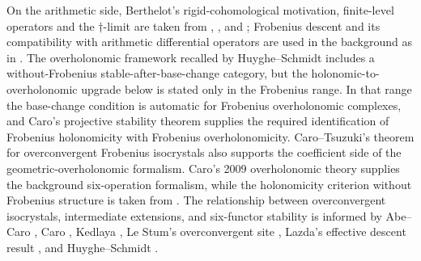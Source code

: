 \documentclass[11pt]{amsart}
\theoremstyle{plain}
\theoremstyle{definition}
\theoremstyle{remark}
\begin{document}
On the arithmetic side, Berthelot's rigid-cohomological motivation,
finite-level operators and the \(\dagger\)-limit are taken from
\cite[\S3]{BerthelotRigidDwork}, \cite[\S\S2.2--3]{BerthelotDModules}, and
\cite[\S2]{BerthelotIntro}; Frobenius descent and its compatibility with
arithmetic differential operators are used in the background as in
\cite[\S3]{BerthelotDescente}.  The overholonomic framework recalled by Huyghe--Schmidt
\cite[\S2.1, first paragraphs, Definition 2.1.3 and Theorem 2.1.4]{HuygheSchmidtIntermediate} includes a without-Frobenius
stable-after-base-change category, but the holonomic-to-overholonomic upgrade below is
stated only in the Frobenius range. In that range the base-change condition is automatic for
Frobenius overholonomic complexes, and Caro's projective stability theorem supplies the required identification of Frobenius holonomicity with Frobenius overholonomicity. Caro--Tsuzuki's theorem for overconvergent Frobenius isocrystals also supports the coefficient side of the geometric-overholonomic formalism. Caro's 2009 overholonomic theory \cite{CaroSurholonomie} supplies the
background six-operation formalism, while the holonomicity criterion without
Frobenius structure is taken from
\cite[Th\'eor\`eme 2.2.8]{CaroHolonomieSansFrobenius}.  The relationship
between overconvergent isocrystals, intermediate extensions, and six-functor
stability is informed by Abe--Caro \cite[\S4]{AbeCaroWeights}, Caro
\cite[\S3]{CaroOverconvergentFIsocrystals}, Kedlaya
\cite[\S2]{KedlayaNotesIsocrystals}, Le Stum's overconvergent site
\cite[Sections 7--8]{LeStumOverconvergentSite}, Lazda's effective descent
result \cite[Theorem 5.1]{LazdaDescent}, and Huyghe--Schmidt
\cite[Theorem 2.3.4]{HuygheSchmidtIntermediate}.
\end{document}
